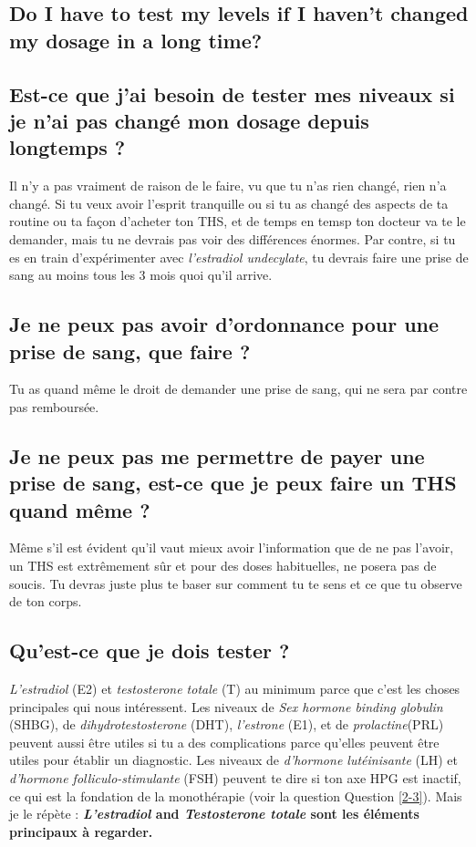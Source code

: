 \documentclass{article}
\begin{document}
\subsection{Do I have to test my levels if I haven’t changed my dosage in a long time?}
\subsection{Est-ce que j'ai besoin de tester mes niveaux si je n'ai pas changé mon dosage depuis longtemps ?}

Il n'y a pas vraiment de raison de le faire, vu que tu n'as rien changé, rien n'a changé. Si tu veux avoir l'esprit tranquille ou si tu as changé des aspects de ta routine ou ta façon d'acheter ton THS, et de temps en temsp ton docteur va te le demander, mais tu ne devrais pas voir des différences énormes. Par contre, si tu es en train d'expérimenter avec \textit{l'estradiol undecylate}, tu devrais faire une prise de sang au moins tous les 3 mois quoi qu'il arrive. 

\subsection{Je ne peux pas avoir d'ordonnance pour une prise de sang, que faire ?}

Tu as quand même le droit de demander une prise de sang, qui ne sera par contre pas remboursée.

\subsection{Je ne peux pas me permettre de payer une prise de sang, est-ce que je peux faire un THS quand même ?}

Même s'il est évident qu'il vaut mieux avoir l'information que de ne pas l'avoir, un THS est extrêmement sûr et pour des doses habituelles, ne posera pas de soucis. Tu devras juste plus te baser sur comment tu te sens et ce que tu observe de ton corps.

\subsection{Qu'est-ce que je dois tester ?}

\textit{L'estradiol} (E2) et \textit{testosterone totale} (T) au minimum parce que c'est les choses principales qui nous intéressent. Les niveaux de \textit{Sex hormone binding globulin} (SHBG), de \textit{dihydrotestosterone} (DHT), \textit{l'estrone} (E1), et de \textit{prolactine}(PRL) peuvent aussi être utiles si tu a des complications parce qu'elles peuvent être utiles pour établir un diagnostic. Les niveaux de \textit{d'hormone lutéinisante} (LH) et \textit{d'hormone folliculo-stimulante} (FSH) peuvent te dire si ton axe HPG est inactif, ce qui est la fondation de la monothérapie (voir la question Question \ref{2-3}). Mais je le répète : \textbf{\textit{L'estradiol} and \textit{Testosterone totale} sont les éléments principaux à regarder.} 
\end{document}
